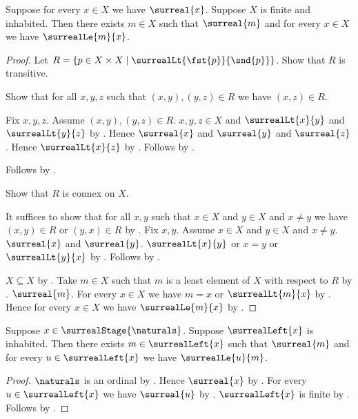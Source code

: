 \begin{theorem}\label{finite_surreal_minimum}
    Suppose for every $x\in X$ we have $\surreal{x}$.
    Suppose $X$ is finite and inhabited.
    Then there exists $m\in X$ such that $\surreal{m}$ and
        for every $x\in X$ we have $\surrealLe{m}{x}$.
\end{theorem}
\begin{proof}
    Let $R=\{p\in X\times X\mid
        \surrealLt{\fst{p}}{\snd{p}}\}$.
    Show that $R$ is transitive.
    \begin{subproof}
        Show that for all $x,y,z$ such that
            $(x,y),(y,z)\in R$ we have $(x,z)\in R$.
        \begin{subproof}
            Fix $x,y,z$.
            Assume $(x,y),(y,z)\in R$.
            $x,y,z\in X$ and
                $\surrealLt{x}{y}$ and $\surrealLt{y}{z}$
                by .
            Hence $\surreal{x}$ and $\surreal{y}$ and $\surreal{z}$.
            Hence $\surrealLt{x}{z}$
                by .
            Follows by .
        \end{subproof}
        Follows by .
    \end{subproof}
    Show that $R$ is connex on $X$.
    \begin{subproof}
        It suffices to show that for all $x,y$ such that
            $x\in X$ and $y\in X$ and $x\neq y$ we have
            $(x,y)\in R$ or $(y,x)\in R$ by .
        Fix $x,y$.
        Assume $x\in X$ and $y\in X$ and $x\neq y$.
        $\surreal{x}$ and $\surreal{y}$.
        $\surrealLt{x}{y}$ or $x=y$ or $\surrealLt{y}{x}$
            by .
        Follows by .
    \end{subproof}
    $X\subseteq X$ by .
    Take $m\in X$ such that
        $m$ is a least element of $X$ with respect to $R$
        by .
    $\surreal{m}$.
    For every $x\in X$ we have $m=x$ or $\surrealLt{m}{x}$
        by .
    Hence for every $x\in X$ we have $\surrealLe{m}{x}$
        by .
\end{proof}

\begin{corollary}\label{finite_surreal_left_maximum}
    Suppose $x\in\surrealStage{\naturals}$.
    Suppose $\surrealLeft{x}$ is inhabited.
    Then there exists $m\in\surrealLeft{x}$ such that $\surreal{m}$ and
        for every $u\in\surrealLeft{x}$ we have $\surrealLe{u}{m}$.
\end{corollary}
\begin{proof}
    $\naturals$ is an ordinal by .
    Hence $\surreal{x}$ by .
    For every $u\in\surrealLeft{x}$ we have $\surreal{u}$
        by .
    $\surrealLeft{x}$ is finite by .
    Follows by .
\end{proof}

